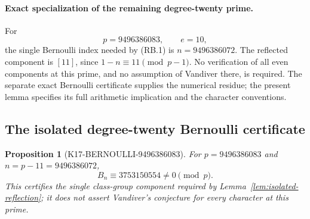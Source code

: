 \documentclass[11pt,a4paper]{article}
\newtheorem{proposition}[theorem]{Proposition}
\theoremstyle{definition}
\begin{document}
\paragraph{Exact specialization of the remaining degree-twenty prime.}
For
\[
                 p=9496386083,\qquad e=10,
\]
the single Bernoulli index needed by (RB.1) is
$n=9496386072$. The reflected component is $[11]$, since
$1-n\equiv11\pmod{p-1}$. No verification of all even components at
this prime, and no assumption of Vandiver there, is required. The
separate exact Bernoulli certificate supplies the numerical residue;
the present lemma specifies its full arithmetic implication and the
character conventions.

\subsection{The isolated degree-twenty Bernoulli certificate}
\label{sec:bernoulli-residual-prime}

\begin{proposition}[K17-BERNOULLI-9496386083]
\label{prop:bernoulli-residual-prime}
\label{prop:bernoulli-residue}
For $p=9496386083$ and $n=p-11=9496386072$,
\[
                  B_n\equiv3753150554\ne0\pmod p.
 \tag{BC.1}
\]
This certifies the single class-group component required by
Lemma~\ref{lem:isolated-reflection}; it does not assert Vandiver's
conjecture for every character at this prime.
\end{proposition}
\end{document}
